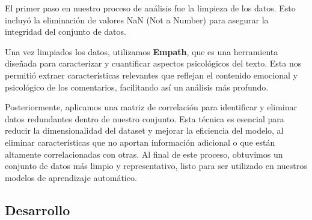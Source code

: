 \documentclass[
10pt, %
a4paper, %
oneside, %
headinclude,footinclude, %
BCOR5mm, %
]{scrartcl}
\begin{document}
El primer paso en nuestro proceso de análisis fue la limpieza de los datos. Esto incluyó la eliminación de valores NaN (Not a Number) para asegurar la integridad del conjunto de datos. 

Una vez limpiados los datos, utilizamos \textbf{Empath}, que es una herramienta diseñada para caracterizar y cuantificar aspectos psicológicos del texto. 
Esta nos permitió extraer características relevantes que reflejan el contenido emocional y psicológico de los comentarios, facilitando así un análisis más profundo.

Posteriormente, aplicamos una matriz de correlación para identificar y eliminar datos redundantes dentro de nuestro conjunto. 
Esta técnica es esencial para reducir la dimensionalidad del dataset y mejorar la eficiencia del modelo, al eliminar características que no aportan información adicional o que están altamente correlacionadas con otras. 
Al final de este proceso, obtuvimos un conjunto de datos más limpio y representativo, listo para ser utilizado en nuestros modelos de aprendizaje automático.


\subsection{Desarrollo}





 











\renewcommand{\refname}{\spacedlowsmallcaps{References}} %




\end{document}
